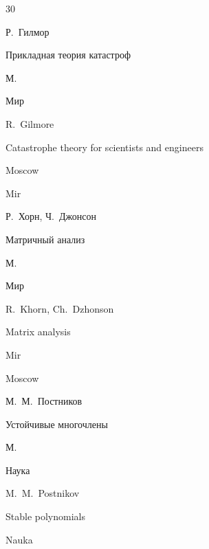 {\begin{thebibliography}{30}

\by Р.~Гилмор

\book Прикладная теория катастроф


\publaddr М.

\publ Мир



\misctransl

\by R.~Gilmore

\book Catastrophe theory for scientists and engineers


\publaddr Moscow

\publ Mir








\by Р.~Хорн, Ч.~Джонсон

\book Матричный анализ

\publaddr М.

\publ Мир



\misctransl

\by R.~Khorn, Ch.~Dzhonson

\book Matrix analysis

\publ Mir

\publaddr Moscow










\by М.~М.~Постников

\book Устойчивые многочлены

\publaddr М.

\publ Наука



\misctransl

\by M.~M.~Postnikov 

\book Stable polynomials

\publ Nauka


\end{thebibliography}}

